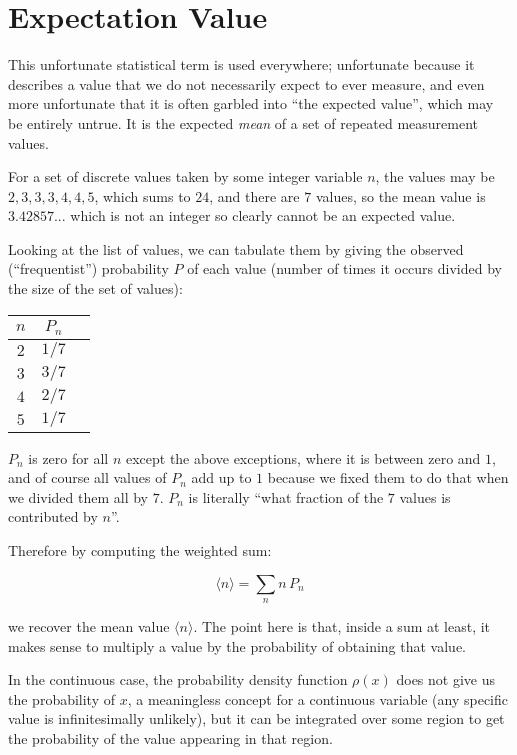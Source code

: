 \chapter{Expectation Value}

This unfortunate statistical term is used everywhere; unfortunate because it describes a value that we do not necessarily expect to ever measure, and even more unfortunate that it is often garbled into ``the expected value'', which may be entirely untrue. It is the expected \textit{mean} of a set of repeated measurement values.

For a set of discrete values taken by some integer variable $n$, the values may be $2, 3, 3, 3, 4, 4, 5$, which sums to $24$, and there are $7$ values, so the mean value is $3.42857...$ which is not an integer so clearly cannot be an expected value.

Looking at the list of values, we can tabulate them by giving the observed (``frequentist'') probability $P$ of each value (number of times it occurs divided by the size of the set of values):

\begin{center}
    \begin{tabular}{ c|c|c }
        $n$ & $P_n$ \\
        \hline
        $2$ & $1/7$  \\
        $3$ & $3/7$  \\
        $4$ & $2/7$  \\
        $5$ & $1/7$
    \end{tabular}
\end{center}

$P_n$ is zero for all $n$ except the above exceptions, where it is between zero and $1$, and of course all values of $P_n$ add up to $1$ because we fixed them to do that when we divided them all by $7$. $P_n$ is literally ``what fraction of the $7$ values is contributed by $n$''.

Therefore by computing the weighted sum:

$$ \langle {n} \rangle = \sum_n{n\,P_n} $$

we recover the mean value $\langle{n}\rangle$. The point here is that, inside a sum at least, it makes sense to multiply a value by the probability of obtaining that value.

In the continuous case, the probability density function $\rho(x)$ does not give us the probability of $x$, a meaningless concept for a continuous variable (any specific value is infinitesimally unlikely), but it can be integrated over some region to get the probability of the value appearing in that region.

